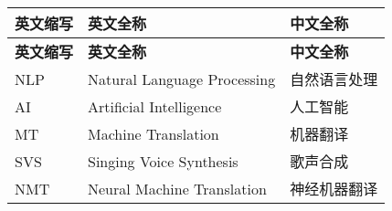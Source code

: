 \cleardoublepage
{}
\begin{center}
    \begin{longtable}{m{2cm}m{8cm}m{5cm}}
        \toprule
        \textbf{英文缩写}&\textbf{英文全称}&\textbf{中文全称}\\
        \midrule
        \endfirsthead
        \toprule
        \textbf{英文缩写}&\textbf{英文全称}&\textbf{中文全称}\\
        \midrule
        \endhead
        \bottomrule
        \endfoot
        \bottomrule
        \endlastfoot
        NLP&Natural Language Processing&自然语言处理\\
        AI&Artificial Intelligence&人工智能\\
        MT&Machine Translation&机器翻译\\
        SVS&Singing Voice Synthesis&歌声合成\\
        NMT&Neural Machine Translation&神经机器翻译\\
	\end{longtable}
\end{center}
